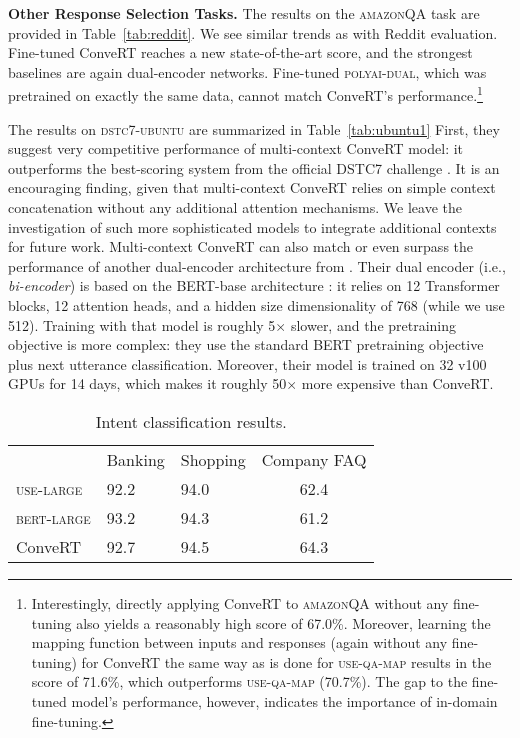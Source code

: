 \documentclass[11pt,a4paper]{article}
\begin{document}
\vspace{1.3mm}
\noindent \textbf{Other Response Selection Tasks.} 
The results on the \textsc{amazonQA} task are provided in Table~\ref{tab:reddit}. We see similar trends as with Reddit evaluation. Fine-tuned ConveRT reaches a new state-of-the-art score, and the strongest baselines are again dual-encoder networks. Fine-tuned \textsc{polyai-dual}, which was pretrained on exactly the same data, cannot match ConveRT's performance.\footnote{Interestingly, directly applying ConveRT to \textsc{amazonQA} without any fine-tuning also yields a reasonably high score of 67.0\%. Moreover, learning the mapping function between inputs and responses (again without any fine-tuning) for ConveRT the same way as is done for \textsc{use-qa-map} results in the score of 71.6\%, which outperforms \textsc{use-qa-map} (70.7\%). The gap to the fine-tuned model's performance, however, indicates the importance of in-domain fine-tuning.}

The results on \textsc{dstc7-ubuntu} are summarized in Table~\ref{tab:ubuntu1} First, they suggest very competitive performance of multi-context ConveRT model: it outperforms the best-scoring system from the official DSTC7 challenge \cite{Gunasekara:2019dstc7}. It is an encouraging finding, given that multi-context ConveRT relies on simple context concatenation without any additional attention mechanisms. We leave the investigation of such more sophisticated models to integrate additional contexts for future work. Multi-context ConveRT can also match or even surpass the performance of another dual-encoder architecture from . Their dual encoder (i.e., \textit{bi-encoder}) is based on the BERT-base architecture \cite{Humeau:2019arxiv}: it relies on 12 Transformer blocks, 12 attention heads, and a hidden size dimensionality of 768 (while we use 512). Training with that model is roughly 5$\times$ slower, and the pretraining objective is more complex: they use the standard BERT pretraining objective plus next utterance classification. Moreover, their model is trained on 32 v100 GPUs for 14 days, which makes it roughly 50$\times$ more expensive than ConveRT.

\begin{table}[!t]
	\centering
    \def\arraystretch{0.85}
    {\small
	\begin{tabularx}{\linewidth}{l YYc}
	    \toprule
	    {} & {Banking} & {Shopping} & {Company FAQ} \\
	    \cmidrule(lr){2-4}
	    \textsc{use-large} & {92.2} & {94.0} & {62.4} \\
	    \textsc{bert-large} & {93.2} & {94.3} & {61.2} \\
	    \cmidrule(lr){2-4}
	    {ConveRT} & {92.7} & {94.5} & {64.3}\\
		\bottomrule       
	\end{tabularx}}\vspace{-1.5mm}
     \caption{Intent classification results.} \label{tab:intent}
     \vspace{-2.5mm}
\end{table}
\end{document}
